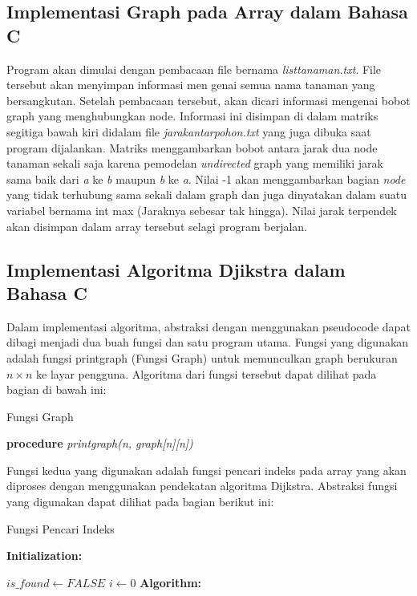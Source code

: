 \documentclass[conference]{IEEEtran}
\begin{document}
\subsection{Implementasi Graph pada Array dalam Bahasa C}

Program akan dimulai dengan pembacaan file bernama \textit {listtanaman.txt}. File tersebut akan menyimpan informasi men genai semua nama tanaman yang bersangkutan. Setelah pembacaan tersebut, akan dicari informasi mengenai bobot graph yang menghubungkan node. Informasi ini disimpan di dalam matriks segitiga bawah kiri didalam file \textit {jarakantarpohon.txt} yang juga dibuka saat program dijalankan. Matriks menggambarkan bobot antara jarak dua node tanaman sekali saja karena pemodelan \textit {undirected} graph yang memiliki jarak sama baik dari \textit a ke \textit b maupun \textit b ke \textit a. Nilai -1 akan menggambarkan bagian \textit {node} yang tidak terhubung sama sekali dalam graph dan juga dinyatakan dalam suatu variabel bernama int max (Jaraknya sebesar tak hingga). Nilai jarak terpendek akan disimpan dalam array tersebut selagi program berjalan.
\subsection{Implementasi Algoritma Djikstra dalam Bahasa C}
	Dalam implementasi algoritma, abstraksi dengan menggunakan pseudocode dapat dibagi menjadi dua buah fungsi dan satu program utama. Fungsi yang digunakan adalah fungsi printgraph (Fungsi Graph) untuk memunculkan graph berukuran $n \times n$ ke layar pengguna. Algoritma dari fungsi tersebut dapat dilihat pada bagian di bawah ini:
\begin{algorithm}
\caption{Fungsi Graph }\label{alg:two}
\textbf{procedure} \textit{printgraph(n, graph[n][n])}
\newline
{}
\end{algorithm}
	
Fungsi kedua yang digunakan adalah fungsi pencari indeks pada array yang akan diproses dengan menggunakan pendekatan algoritma Dijkstra. Abstraksi fungsi yang digunakan dapat dilihat pada bagian berikut ini:
\begin{algorithm}
\caption{Fungsi Pencari Indeks }\label{alg:three}
\textbf{Initialization:}

$is\_found \gets FALSE$\;
$i \gets 0$\;
\textbf{Algorithm:}

\end{algorithm}
\end{document}

